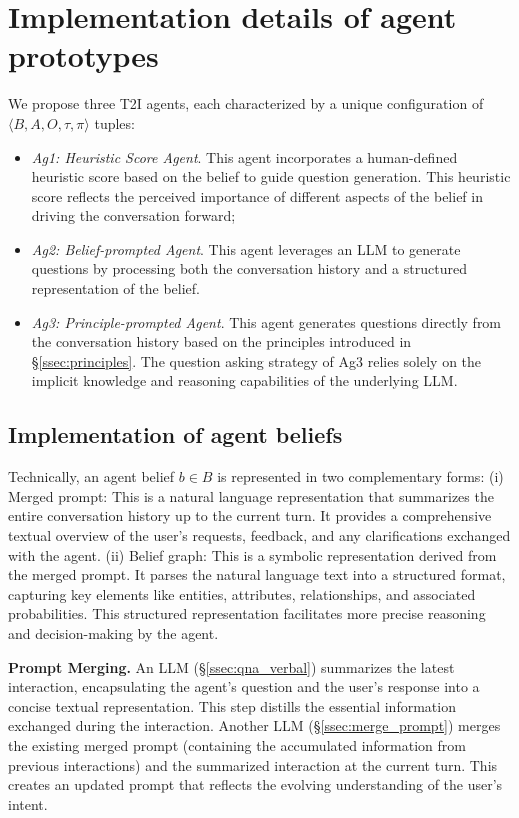 

\section{Implementation details of agent prototypes} \label{ssec:implementation}
We propose three T2I agents, each characterized by a unique configuration of $\langle B, A, O, \tau, \pi\rangle$ tuples: 
\begin{itemize}
    \item \textit{Ag1: Heuristic Score Agent}. This agent incorporates a human-defined heuristic score based on the belief to guide question generation. This heuristic score reflects the perceived importance of different aspects of the belief in driving the conversation forward;
    \item \textit{Ag2: Belief-prompted Agent}. This agent leverages an LLM to generate questions by processing both the conversation history and a structured representation of the belief.
    \item \textit{Ag3: Principle-prompted Agent}. This agent generates questions directly from the conversation history based on the principles introduced in \S\ref{ssec:principles}. The question asking strategy of Ag3 relies solely on the implicit knowledge and reasoning capabilities of the underlying LLM.
\end{itemize}

\subsection{Implementation of agent beliefs} \label{sssec:state_implementation}



Technically, an agent belief $b\in B$ is represented in two complementary forms: (i) Merged prompt: This is a natural language representation that summarizes the entire conversation history up to the current turn. It provides a comprehensive textual overview of the user's requests, feedback, and any clarifications exchanged with the agent. (ii) Belief graph: This is a symbolic representation derived from the merged prompt. It parses the natural language text into a structured format, capturing key elements like entities, attributes, relationships, and associated probabilities. This structured representation facilitates more precise reasoning and decision-making by the agent.

\textbf{Prompt Merging.}  An LLM (\S\ref{ssec:qna_verbal}) summarizes the latest interaction, encapsulating the agent's question and the user's response into a concise textual representation. This step distills the essential information exchanged during the interaction. Another LLM (\S\ref{ssec:merge_prompt}) merges the existing merged prompt (containing the accumulated information from previous interactions) and the summarized interaction at the current turn. This creates an updated prompt that reflects the evolving understanding of the user's intent.

